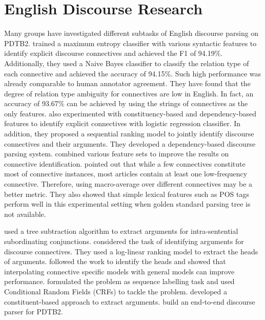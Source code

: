 \section{English Discourse Research}

Many groups have investigated different subtasks of English
discourse parsing on PDTB2. \cite{pitler2009using} trained a maximum
entropy classifier with various syntactic features to identify explicit discourse
connectives and achieved the F1 of 94.19\%. Additionally, they used
a Naive Bayes classifier to classify the relation type of each connective and
achieved the accuracy of 94.15\%. Such high performance was already comparable to human
annotator agreement. They have found that the degree of relation type ambiguity
for connectives are low in English. In fact, an accuracy of 93.67\% can be achieved
by using the strings of connectives as the only features. \cite{wellner2009sequence}
also experimented with constituency-based and dependency-based features to identify
explicit connectives with logistic regression classifier. In addition, they proposed
a sequential ranking model to jointly identify discourse connectives and their arguments.
They developed a dependency-based discourse parsing system. \cite{faiz2013identifying} combined
various feature sets to improve the results on connective identification. \cite{j2013disambig} pointed
out that while a few connectives constitute most of connective instances, most articles contain
at least one low-frequency connective. Therefore, using macro-average over different connectives
may be a better metric. They also showed that simple lexical features such as POS tags perform
well in this experimental setting when golden standard parsing tree is not available.

\cite{dines2005attribution} used a tree subtraction algorithm to extract arguments for
intra-sentential subordinating conjunctions. \cite{wellner2007auto} considered the task of identifying
arguments for discourse connectives. They used a log-linear ranking model to extract the heads of arguments.
\cite{elwell2008discourse} followed the work to identify the heads and showed that
interpolating connective specific models with general models can improve performance.
\cite{ghosh2011shallow,ghosh2012global} formulated the problem as sequence labelling task
and used Conditional Random Fields (CRFs) to tackle the problem.
\cite{kong2014a} developed a constituent-based approach to extract arguments.
\cite{lin2014pdtb} build an end-to-end discourse parser for PDTB2.


